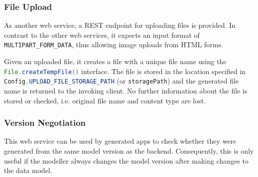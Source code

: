 \subsubsection{File Upload}

As another web service, a REST endpoint for uploading files is provided.
In contrast to the other web services, it expects an input format of \lstinline|MULTIPART_FORM_DATA|, thus allowing image uploads from HTML forms.

Given an uploaded file, it creates a file with a unique file name using the \lstinline[language=Java]|File.createTempFile()| interface. The file is stored in the location specified in \lstinline[language=Java]|Config.UPLOAD_FILE_STORAGE_PATH| (or \lstinline|storagePath|) and the generated file name is returned to the invoking client. No further information about the file is stored or checked, i.e. original file name and content type are lost.


\subsubsection{Version Negotiation} 
This web service can be used by generated apps to check whether they were generated from the same model version as the backend. Consequently, this is only useful if the modeller always changes the model version after making changes to the data model.